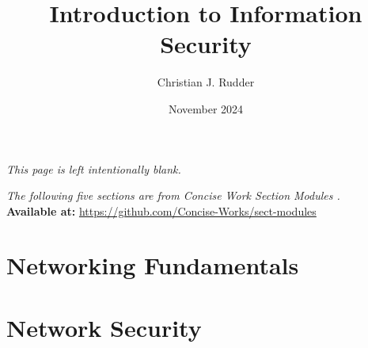 \documentclass{memoir}
\title{Introduction to Information Security}
\author{Christian J. Rudder}
\date{November 2024}
\begin{document}
\maketitle
\setcounter{tocdepth}{2}

\tableofcontents

\newpage
\thispagestyle{empty}
\mbox{}
\vfill
\begin{center}
    \textit{This page is left intentionally blank.}
\end{center}
\vfill
\newpage
\thispagestyle{empty}
\mbox{}
\vfill
\begin{center}
    \textit{The following five sections are from Concise Work Section Modules \cite{concise_works_modules}.}\\
    \textbf{Available at:} \url{https://github.com/Concise-Works/sect-modules}
\end{center}
\vfill

% 
% 
% 
% 

\chapter{Networking Fundamentals}


\chapter{Network Security}




\end{document}
